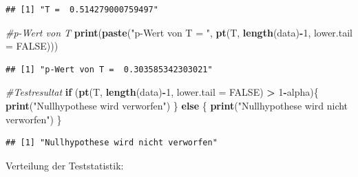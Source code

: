 \documentclass[]{article}
\newenvironment{Shaded}{\begin{snugshade}}{\end{snugshade}}
\newcommand{\CommentTok}[1]{\textcolor[rgb]{0.56,0.35,0.01}{\textit{#1}}}
\newcommand{\ControlFlowTok}[1]{\textcolor[rgb]{0.13,0.29,0.53}{\textbf{#1}}}
\newcommand{\DataTypeTok}[1]{\textcolor[rgb]{0.13,0.29,0.53}{#1}}
\newcommand{\DecValTok}[1]{\textcolor[rgb]{0.00,0.00,0.81}{#1}}
\newcommand{\KeywordTok}[1]{\textcolor[rgb]{0.13,0.29,0.53}{\textbf{#1}}}
\newcommand{\NormalTok}[1]{#1}
\newcommand{\OperatorTok}[1]{\textcolor[rgb]{0.81,0.36,0.00}{\textbf{#1}}}
\newcommand{\OtherTok}[1]{\textcolor[rgb]{0.56,0.35,0.01}{#1}}
\newcommand{\StringTok}[1]{\textcolor[rgb]{0.31,0.60,0.02}{#1}}
\begin{document}
\begin{verbatim}
## [1] "T =  0.514279000759497"
\end{verbatim}

\begin{Shaded}
\begin{Highlighting}[]
\CommentTok{#p-Wert von T}
\KeywordTok{print}\NormalTok{(}\KeywordTok{paste}\NormalTok{(}\StringTok{"p-Wert von T = "}\NormalTok{, }\KeywordTok{pt}\NormalTok{(T, }\KeywordTok{length}\NormalTok{(data)}\OperatorTok{-}\DecValTok{1}\NormalTok{, }\DataTypeTok{lower.tail =} \OtherTok{FALSE}\NormalTok{)))}
\end{Highlighting}
\end{Shaded}

\begin{verbatim}
## [1] "p-Wert von T =  0.303585342303021"
\end{verbatim}

\begin{Shaded}
\begin{Highlighting}[]
\CommentTok{#Testresultat}
\ControlFlowTok{if}\NormalTok{ (}\KeywordTok{pt}\NormalTok{(T, }\KeywordTok{length}\NormalTok{(data)}\OperatorTok{-}\DecValTok{1}\NormalTok{, }\DataTypeTok{lower.tail =} \OtherTok{FALSE}\NormalTok{) }\OperatorTok{>}\StringTok{ }\DecValTok{1}\OperatorTok{-}\NormalTok{alpha)\{}
  \KeywordTok{print}\NormalTok{(}\StringTok{"Nullhypothese wird verworfen"}\NormalTok{)}
\NormalTok{\} }\ControlFlowTok{else}\NormalTok{ \{}
  \KeywordTok{print}\NormalTok{(}\StringTok{"Nullhypothese wird nicht verworfen"}\NormalTok{)}
\NormalTok{\}}
\end{Highlighting}
\end{Shaded}

\begin{verbatim}
## [1] "Nullhypothese wird nicht verworfen"
\end{verbatim}

Verteilung der Teststatistik:
\end{document}
